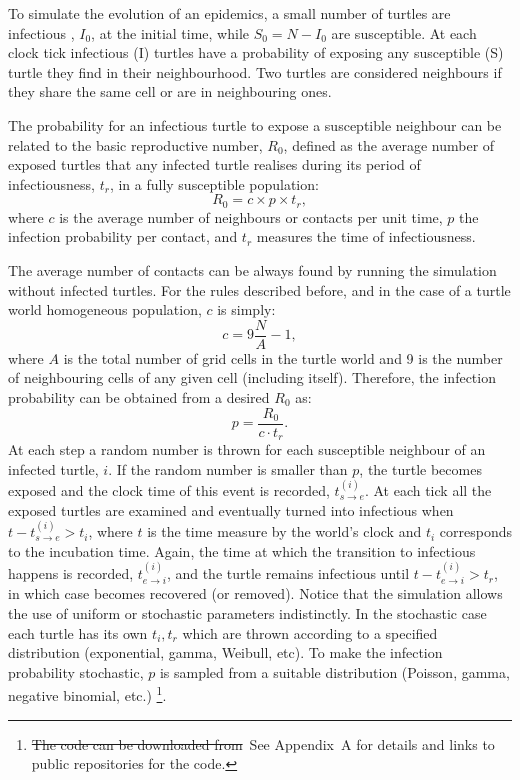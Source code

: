 \documentclass[a4paper,oneside,11pt]{article}
\newcommand{\myreplacement}[2]{\textcolor[rgb]{0.75,0,0.75}{\sout{#1}~#2}}
\begin{document}
To simulate the evolution of an epidemics, a small number of turtles are infectious , $I_0$, at the initial time, while $S_0 = N-I_0$ are susceptible. At each clock tick infectious (I) turtles have a probability of exposing any susceptible (S) turtle they find in their neighbourhood. Two turtles are considered neighbours if they share the same cell or are in  neighbouring ones. 

The probability for an infectious turtle to expose a susceptible neighbour can be related to the basic reproductive number, $R_0$,  defined as the average number of exposed turtles that any infected turtle realises during its period of infectiousness, $t_r$, in a fully susceptible population: 
\begin{equation}
R_0 = c \times p \times t_r,
\label{eq:r0cptr}
\end{equation}
where $c$ is the average number of neighbours or contacts per unit time, $p$ the infection probability per contact, and $t_r$ measures the time of infectiousness. 

The average number of contacts can be always found by running the simulation without infected turtles. For the rules described before, and in the case of a turtle world homogeneous population, $c$ is simply:
\begin{equation}
c = 9 \frac{N}{A}-1,
\end{equation}
%
where $A$ is the total number of grid cells in the turtle world and 9 is the number of  neighbouring cells of any given cell (including itself). Therefore, the infection probability can be obtained from a desired $R_0$  as:
\begin{equation}
p = \frac{R_0}{c \cdot t_r}.
\end{equation}
At each step a random number is thrown for each susceptible neighbour of an infected turtle, $i$. If the random number is smaller than $p$, the turtle becomes exposed and the clock time of this event is recorded, $t_{s\rightarrow e}^{(i)}$. At each tick all the exposed turtles are examined and eventually turned into infectious when 
$t - t^{(i)}_{s\rightarrow e} > t_i$, where $t$ is the time measure by the world's clock and $t_i$ corresponds to the incubation time. Again, the time at which the transition to infectious happens is recorded, $t^{(i)}_{e\rightarrow i}$, and the turtle remains infectious until $t - t^{(i)}_{e\rightarrow i} > t_r$, in which case becomes recovered (or removed).
Notice that the simulation allows the use of uniform or stochastic parameters indistinctly. In the stochastic case each turtle has its own $t_i, t_r$ which are thrown according to a specified distribution (exponential, gamma, Weibull, etc). To make the infection probability stochastic, $p$ is sampled from a suitable distribution (Poisson, gamma, negative binomial, etc.) \footnote{\myreplacement{The code can be downloaded from}{See Appendix~A for details and links to public repositories for the code.}}.
\end{document}
